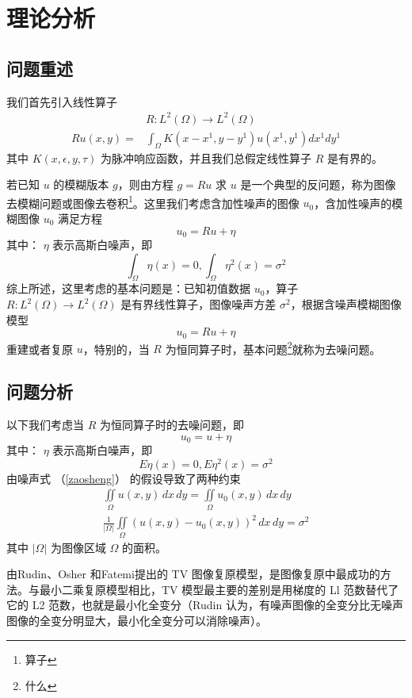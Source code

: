 \section{理论分析}
\subsection{问题重述}
我们首先引入线性算子
\begin{align*}
&R:L^2(\Omega) \longrightarrow L^2(\Omega) \\
Ru(x,y)=&\int_\Omega K(x-x^1,y-y^1)u(x^1,y^1)dx^1dy^1
\end{align*}
其中 $K(x,\epsilon,y,\tau)$ 为脉冲响应函数，并且我们总假定线性算子 $R$ 是有界的。

若已知 $u$ 的模糊版本 $g$，则由方程 $g=Ru$ 求 $u$ 是一个典型的反问题，称为图像去模糊问题或图像去卷积\footnote{算子}。这里我们考虑含加性噪声的图像 $u_0$，含加性噪声的模糊图像 $u_0$ 满足方程
\[u_0=Ru+\eta\]
其中： $\eta$ 表示高斯白噪声，即
\[\int_\Omega \eta(x)=0,\int_\Omega \eta^2(x)=\sigma^2\]
综上所述，这里考虑的基本问题是：已知初值数据 $u_0$，算子 $R:L^2(\Omega) \longrightarrow L^2(\Omega)$ 是有界线性算子，图像噪声方差 $\sigma^2$，根据含噪声模糊图像模型
\[u_0=Ru+\eta\]
重建或者复原 $u$，特别的，当 $R$ 为恒同算子时，基本问题\footnote{什么}就称为去噪问题。

\subsection{问题分析}
以下我们考虑当 $R$ 为恒同算子时的去噪问题，即
\begin{equation}
u_0=u+\eta
\end{equation}
其中： $\eta$ 表示高斯白噪声，即
\begin{equation}
\label{zaosheng}
E\eta(x)=0,E\eta^2(x)=\sigma^2
\end{equation}
由噪声式 （\ref{zaosheng}） 的假设导致了两种约束
\begin{align}
\iint\limits_\Omega u(x,y)\,dx\,dy =\iint\limits_\Omega u_0(x,y)\,dx\,dy\\
\frac{1}{|\Omega|}\iint\limits_\Omega (u(x,y)-u_0(x,y))^2\,dx\,dy =\sigma^2
\end{align}
其中 $|\Omega|$ 为图像区域 $\Omega$ 的面积。

由Rudin、Osher 和Fatemi提出的 TV 图像复原模型，是图像复原中最成功的方法。与最小二乘复原模型相比，TV 模型最主要的差别是用梯度的 Ll 范数替代了它的 L2 范数，也就是最小化全变分（Rudin 认为，有噪声图像的全变分比无噪声图像的全变分明显大，最小化全变分可以消除噪声）。

